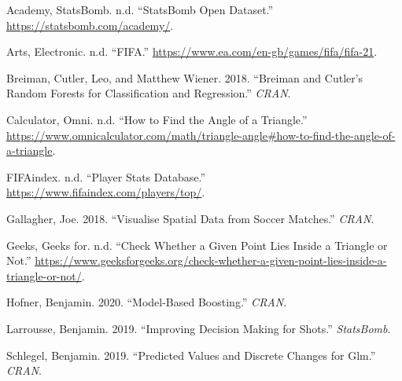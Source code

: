 \documentclass[]{article}
\begin{document}
\hypertarget{refs}{}
\begin{cslreferences}
\leavevmode\hypertarget{ref-StAc19}{}%
Academy, StatsBomb. n.d. ``StatsBomb Open Dataset.''
\url{https://statsbomb.com/academy/}.

\leavevmode\hypertarget{ref-FIFA}{}%
Arts, Electronic. n.d. ``FIFA.''
\url{https://www.ea.com/en-gb/games/fifa/fifa-21}.

\leavevmode\hypertarget{ref-random}{}%
Breiman, Cutler, Leo, and Matthew Wiener. 2018. ``Breiman and Cutler's
Random Forests for Classification and Regression.'' \emph{CRAN}.

\leavevmode\hypertarget{ref-omni}{}%
Calculator, Omni. n.d. ``How to Find the Angle of a Triangle.''
\url{https://www.omnicalculator.com/math/triangle-angle\#how-to-find-the-angle-of-a-triangle}.

\leavevmode\hypertarget{ref-Findex}{}%
FIFAindex. n.d. ``Player Stats Database.''
\url{https://www.fifaindex.com/players/top/}.

\leavevmode\hypertarget{ref-soccermatics}{}%
Gallagher, Joe. 2018. ``Visualise Spatial Data from Soccer Matches.''
\emph{CRAN}.

\leavevmode\hypertarget{ref-geek}{}%
Geeks, Geeks for. n.d. ``Check Whether a Given Point Lies Inside a
Triangle or Not.''
\url{https://www.geeksforgeeks.org/check-whether-a-given-point-lies-inside-a-triangle-or-not/}.

\leavevmode\hypertarget{ref-boost}{}%
Hofner, Benjamin. 2020. ``Model-Based Boosting.'' \emph{CRAN}.

\leavevmode\hypertarget{ref-BeLa19}{}%
Larrousse, Benjamin. 2019. ``Improving Decision Making for Shots.''
\emph{StatsBomb}.

\leavevmode\hypertarget{ref-glm}{}%
Schlegel, Benjamin. 2019. ``Predicted Values and Discrete Changes for
Glm.'' \emph{CRAN}.
\end{cslreferences}
\end{document}
